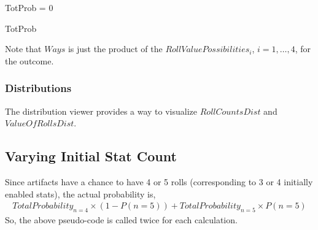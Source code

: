 \documentclass[12pt]{article}
\begin{document}
\begin{algorithm}[H]
	\SetInd{0.4em}{0.4em}

	TotProb = 0 \\
	
	
	\Return TotProb
\end{algorithm}

Note that $Ways$ is just the product of the $RollValuePossibilities_i$, $i = 1, \dots, 4$, for the outcome.

\subsubsection{Distributions}

The distribution viewer provides a way to visualize $RollCountsDist$ and $ValueOfRollsDist$.

\subsection{Varying Initial Stat Count}

Since artifacts have a chance to have 4 or 5 rolls (corresponding to 3 or 4 initially enabled stats), the actual probability is,
\begin{align*}
	TotalProbability_{n=4} \times (1 - P(n = 5)) + TotalProbability_{n=5} \times P(n = 5)
\end{align*}
So, the above pseudo-code is called twice for each calculation.
\end{document}

